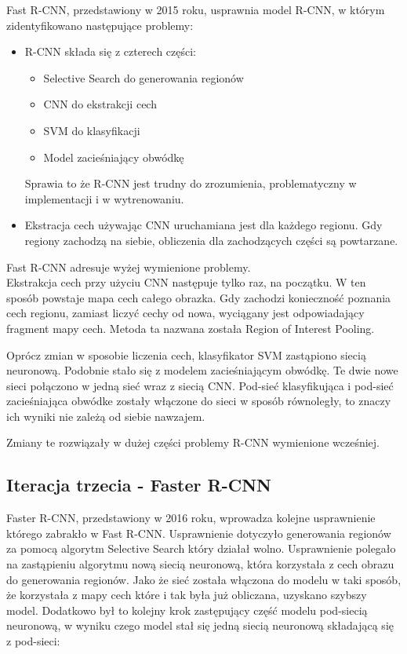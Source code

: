 Fast R-CNN, przedstawiony w 2015 roku, usprawnia model R-CNN, w którym zidentyfikowano następujące problemy:

\begin{itemize}
	\item R-CNN składa się z czterech części:
		\begin{itemize}
			\item Selective Search do generowania regionów
			\item CNN do ekstrakcji cech
			\item SVM do klasyfikacji
			\item Model zacieśniający obwódkę
		\end{itemize}
		Sprawia to że R-CNN jest trudny do zrozumienia, problematyczny w implementacji i w wytrenowaniu.
  \item Ekstracja cech używając CNN uruchamiana jest dla każdego regionu.
        Gdy regiony zachodzą na siebie, obliczenia dla zachodzących części są powtarzane.
\end{itemize}

Fast R-CNN adresuje wyżej wymienione problemy. \\

Ekstrakcja cech przy użyciu CNN następuje tylko raz, na początku.
W ten sposób powstaje mapa cech całego obrazka.
Gdy zachodzi konieczność poznania cech regionu, zamiast liczyć cechy od nowa, wyciągany jest odpowiadający fragment mapy cech.
Metoda ta nazwana została Region of Interest Pooling.

Oprócz zmian w sposobie liczenia cech, klasyfikator SVM zastąpiono siecią neuronową.
Podobnie stało się z modelem zacieśniającym obwódkę.
Te dwie nowe sieci połączono w jedną sieć wraz z siecią CNN.
Pod-sieć klasyfikująca i pod-sieć zacieśniająca obwódke zostały włączone do sieci w sposób równoległy, to znaczy ich wyniki nie zależą od siebie nawzajem.

Zmiany te rozwiązały w dużej części problemy R-CNN wymienione wcześniej.

\subsection{Iteracja trzecia - Faster R-CNN}


Faster R-CNN, przedstawiony w 2016 roku, wprowadza kolejne usprawnienie którego zabrakło w Fast R-CNN.
Usprawnienie dotyczyło generowania regionów za pomocą algorytm Selective Search który działał wolno.
Usprawnienie polegało na zastąpieniu algorytmu nową siecią neuronową, która korzystała z cech obrazu do generowania regionów.
Jako że sieć została włączona do modelu w taki sposób, że korzystała z mapy cech które i tak była już obliczana, uzyskano szybszy model.
Dodatkowo był to kolejny krok zastępujący część modelu pod-siecią neuronową, w wyniku czego model stał się jedną siecią neuronową składającą się z pod-sieci:

